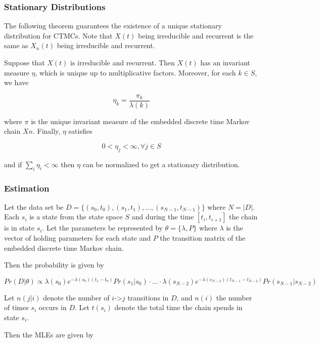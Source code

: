 \documentclass[
  nojss]{jss}
\begin{document}
\hypertarget{stationary-distributions}{%
\subsubsection{Stationary Distributions}\label{stationary-distributions}}

The following theorem guarantees the existence of a unique stationary distribution for CTMCs. Note that \(X(t)\) being irreducible and recurrent is the same as \(X_n(t)\) being irreducible and recurrent.

Suppose that \(X(t)\) is irreducible and recurrent. Then \(X(t)\) has an invariant measure \(\eta\), which is unique up to multiplicative factors. Moreover, for each \(k \in S\), we have

\[\eta_k = \frac{\pi_k}{\lambda(k)}\]

where \(\pi\) is the unique invariant measure of the embedded discrete time Markov chain \(Xn\). Finally, \(\eta\) satisfies

\[0 < \eta_j < \infty, \forall j \in S\]

and if \(\sum_i \eta_i < \infty\) then \(\eta\) can be normalized to get a stationary distribution.

\hypertarget{estimation-1}{%
\subsubsection{Estimation}\label{estimation-1}}

Let the data set be \(D = \{(s_0, t_0), (s_1, t_1), ..., (s_{N-1}, t_{N-1})\}\) where \(N=|D|\). Each \(s_i\) is a state from the state space \(S\) and during the time \([t_i,t_{i+1}]\) the chain is in state \(s_i\). Let the parameters be represented by \(\theta = \{\lambda, P\}\) where \(\lambda\) is the vector of holding parameters for each state and \(P\) the transition matrix of the embedded discrete time Markov chain.

Then the probability is given by

\[
{Pr(D | \theta) \propto \lambda(s_0)e^{-\lambda(s_0)(t_1-t_0)}Pr(s_1|s_0) \cdot\ldots\cdot \lambda(s_{N-2})e^{-\lambda(s_{N-2})(t_{N-1}-t_{N-2})}Pr(s_{N-1}|s_{N-2})}
\]

Let \(n(j|i)\) denote the number of \(i\)-\textgreater{}\(j\) transitions in \(D\), and \(n(i)\) the number of times \(s_i\) occurs in \(D\). Let \(t(s_i)\) denote the total time the chain spends in state \(s_i\).

Then the MLEs are given by
\end{document}
